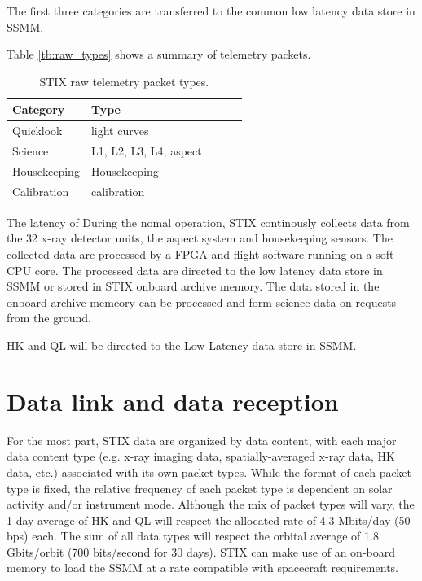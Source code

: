 \documentclass{aa}
\begin{document}
The first three categories are  transferred to the
common low latency data store in SSMM.

Table \ref{tb:raw_types} shows a summary of telemetry packets.

\begin{table}[h]
\caption{STIX raw telemetry packet types.}
\begin{tabular}{lllll}
\hline
Category & Type & & & \\ \hline
Quicklook    & light curves           &  &  &  \\ \hline
Science      & L1, L2, L3, L4, aspect &  &  &  \\ \hline
Housekeeping & Housekeeping           &  &  &  \\ \hline
Calibration  & calibration            &  &  &  \\ \hline
\end{tabular}
\label{raw_types}
\end{table}

The latency of
During the nomal operation, STIX continously collects data from the 32 x-ray detector units, the aspect system and
housekeeping sensors. The collected data are processed by a FPGA and flight software running on a soft CPU core.
The processed data are directed to the low latency data store in SSMM or stored in STIX
onboard archive memory.  The data stored in the onboard archive memeory can
be processed and form science data on requests from the ground.

 HK and QL will be
directed to the Low Latency data store in SSMM.



\section{Data link and data reception}
For the most part, STIX data are organized by data content, with each major data content
type (e.g. x-ray imaging data, spatially-averaged x-ray data, HK data, etc.) associated with
its own packet types. While the format of each packet type is fixed, the relative frequency of
each packet type is dependent on solar activity and/or instrument mode. Although the mix
of packet types will vary, the 1-day average of HK and QL will respect the allocated rate of
4.3 Mbits/day (50 bps) each. The sum of all data types will respect the orbital average of 1.8
Gbits/orbit (700 bits/second for 30 days). STIX can make use of an on-board memory to
load the SSMM at a rate compatible with spacecraft requirements.
\end{document}
